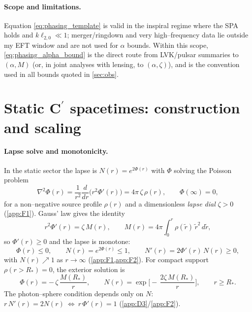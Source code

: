\documentclass{iopjournal}
\begin{document}
\paragraph{Scope and limitations.}
Equation \eqref{eq:phasing_template} is valid in the inspiral regime where the SPA holds and $k\ell_{2,0}\ll1$; merger/ringdown and very high–frequency data lie outside my EFT window and are not used for $\alpha$ bounds. Within this scope, \eqref{eq:phasing_alpha_bound} is the direct route from LVK/pulsar summaries to $(\alpha,M)$ (or, in joint analyses with lensing, to $(\alpha,\zeta)$), and is the convention used in all bounds quoted in \cref{sec:obs}.

\section{\texorpdfstring{Static C$^\prime$ spacetimes: construction and scaling}{Static C' spacetimes: construction and scaling}}\label{sec:static}
\paragraph{Lapse solve and monotonicity.}
In the static sector the lapse is $N(r)=e^{2\Phi(r)}$ with $\Phi$ solving the Poisson problem
\begin{equation}
\nabla^2\Phi(r)=\frac{1}{r^2}\frac{d}{dr}\!\Big(r^2\Phi'(r)\Big)=4\pi\,\zeta\,\rho(r),
\qquad
\Phi(\infty)=0,
\label{eq:7_Poisson}
\end{equation}
for a non–negative source profile $\rho(r)$ and a dimensionless \emph{lapse dial} $\zeta>0$ (\cref{app:F1}). Gauss’ law gives the identity
\begin{equation}
r^{2}\Phi'(r)=\zeta\,M(r),\qquad
M(r)=4\pi\!\int_{0}^{r}\rho(\tilde r)\,\tilde r^{2}\,d\tilde r,
\label{eq:7_flux}
\end{equation}
so $\Phi'(r)\ge0$ and the lapse is monotone:
\begin{equation}
\Phi(r)\le0,\qquad N(r)=e^{2\Phi(r)}\le1,\qquad N'(r)=2\Phi'(r)\,N(r)\ge0,
\label{eq:7_monotone}
\end{equation}
with $N(r)\nearrow1$ as $r\to\infty$ (\cref{app:F1,app:F2}). For compact support $\rho(r>R_\ast)=0$, the exterior solution is
\begin{equation}
\Phi(r)=-\,\zeta\,\frac{M(R_\ast)}{r},\qquad
N(r)=\exp\!\Big[-\,\frac{2\zeta\,M(R_\ast)}{r}\Big],\qquad r\ge R_\ast.
\label{eq:7_ext}
\end{equation}
The photon–sphere condition depends only on $N$:
$r\,N'(r)=2N(r)\ \Leftrightarrow\ r\,\Phi'(r)=1$ (\cref{app:D3}/\cref{app:F2}).
\end{document}
